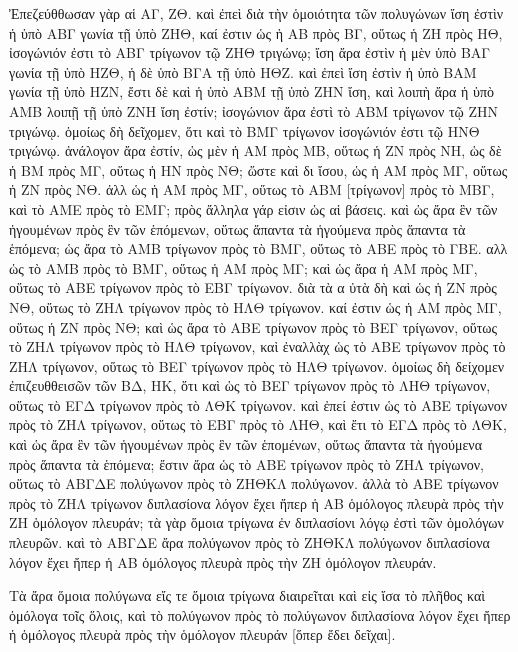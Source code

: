 \begin{Parallel}{}{}
{{\greekfont Ἐπεζεύθθωσαν γὰρ αἱ  ΑΓ, ΖΘ. καὶ ἐπεὶ διὰ τὴν ὁμοιότητα τῶν
πολυγώνων ἴση ἐστὶν ἡ ὑπὸ ΑΒΓ γωνία τῇ ὑπὸ ΖΗΘ, καί ἐστιν ὡς ἡ ΑΒ πρὸς ΒΓ, οὕτως ἡ ΖΗ πρὸς ΗΘ, ἰσογώνιόν ἐστι
τὸ ΑΒΓ τρίγωνον τῷ ΖΗΘ τριγώνῳ; ἴση ἄρα ἐστὶν ἡ μὲν
ὑπὸ ΒΑΓ γωνία τῇ ὑπὸ ΗΖΘ, ἡ δὲ ὑπὸ ΒΓΑ
τῇ ὑπὸ ΗΘΖ. καὶ ἐπεὶ ἴση ἐστὶν ἡ ὑπὸ ΒΑΜ γωνία τῇ ὑπὸ
ΗΖΝ, ἔστι δὲ καὶ ἡ ὑπὸ ΑΒΜ τῇ ὑπὸ ΖΗΝ ἴση, καὶ λοιπὴ
ἄρα ἡ ὑπὸ ΑΜΒ λοιπῇ τῇ ὑπὸ ΖΝΗ ἴση ἐστίν; ἰσογώνιον
ἄρα ἐστὶ τὸ ΑΒΜ τρίγωνον τῷ ΖΗΝ τριγώνῳ. ὁμοίως δὴ δεῖχομεν, ὅτι καὶ τὸ ΒΜΓ τρίγωνον ἰσογώνιόν ἐστι τῷ ΗΝΘ
τριγώνῳ. ἀνάλογον ἄρα ἐστίν, ὡς μὲν ἡ ΑΜ πρὸς ΜΒ, οὕτως ἡ ΖΝ πρὸς ΝΗ, ὡς δὲ ἡ ΒΜ πρὸς ΜΓ, οὕτως ἡ ΗΝ πρὸς ΝΘ; 
ὥστε καὶ δι ἴσου, ὡς ἡ ΑΜ πρὸς ΜΓ, οὕτως ἡ ΖΝ πρὸς ΝΘ.
ἀλλ ὡς ἡ ΑΜ πρὸς ΜΓ, οὕτως τὸ ΑΒΜ [τρίγωνον] πρὸς τὸ
ΜΒΓ, καὶ τὸ ΑΜΕ πρὸς τὸ  ΕΜΓ; πρὸς ἄλληλα γάρ εἰσιν
ὡς αἱ βάσεις. καὶ ὡς ἄρα ἓν τῶν ἡγουμένων πρὸς ἓν
τῶν ἑπόμενων, οὕτως ἅπαντα τὰ ἡγούμενα πρὸς ἅπαντα
τὰ ἑπόμενα; ὡς ἄρα τὸ ΑΜΒ τρίγωνον πρὸς τὸ ΒΜΓ, οὕτως τὸ
ΑΒΕ πρὸς τὸ ΓΒΕ. αλλ ὡς τὸ ΑΜΒ πρὸς τὸ ΒΜΓ, οὕτως
ἡ ΑΜ πρὸς ΜΓ; καὶ ὡς ἄρα ἡ ΑΜ πρὸς ΜΓ, οὕτως τὸ ΑΒΕ
τρίγωνον πρὸς τὸ ΕΒΓ τρίγωνον. διὰ τὰ α ὐτὰ δὴ καὶ ὡς ἡ ΖΝ πρὸς
ΝΘ, οὕτως τὸ ΖΗΛ τρίγωνον πρὸς τὸ ΗΛΘ τρίγωνον. καί ἐστιν ὡς
ἡ ΑΜ πρὸς ΜΓ, οὕτως ἡ ΖΝ πρὸς ΝΘ; καὶ ὡς ἄρα τὸ ΑΒΕ τρίγωνον 
πρὸς τὸ ΒΕΓ τρίγωνον, οὕτως τὸ ΖΗΛ τρίγωνον πρὸς τὸ ΗΛΘ τρίγωνον,
καὶ ἐναλλὰχ ὡς τὸ ΑΒΕ τρίγωνον πρὸς τὸ ΖΗΛ τρίγωνον, οὕτως
τὸ ΒΕΓ τρίγωνον πρὸς τὸ ΗΛΘ τρίγωνον. ὁμοίως δὴ δείχομεν
ἐπιζευθθεισῶν τῶν ΒΔ, ΗΚ, ὅτι καὶ ὡς τὸ ΒΕΓ τρίγωνον πρὸς
τὸ ΛΗΘ τρίγωνον, οὕτως τὸ ΕΓΔ τρίγωνον πρὸς τὸ ΛΘΚ τρίγωνον.
καὶ ἐπεί ἐστιν ὡς τὸ ΑΒΕ τρίγωνον πρὸς τὸ ΖΗΛ τρίγωνον,
οὕτως τὸ ΕΒΓ πρὸς τὸ ΛΗΘ, καὶ ἔτι τὸ ΕΓΔ πρὸς τὸ ΛΘΚ,
καὶ ὡς ἄρα ἓν τῶν ἡγουμένων πρὸς ἓν τῶν ἑπομένων, οὕτως ἅπαντα τὰ ἡγούμενα πρὸς ἅπαντα τὰ ἑπόμενα; ἔστιν
ἄρα ὡς τὸ ΑΒΕ τρίγωνον πρὸς τὸ ΖΗΛ τρίγωνον, οὕτως 
τὸ ΑΒΓΔΕ πολύγωνον πρὸς τὸ ΖΗΘΚΛ πολύγωνον. ἀλλὰ τὸ
ΑΒΕ τρίγωνον πρὸς  τὸ ΖΗΛ τρίγωνον διπλασίονα λόγον ἔχει ἤπερ
ἡ ΑΒ ὁμόλογος πλευρὰ πρὸς τὴν ΖΗ ὁμόλογον πλευράν; τὰ γὰρ
ὅμοια τρίγωνα ἐν διπλασίονι λόγῳ ἐστὶ τῶν ὁμολόγων πλευρῶν.
καὶ τὸ ΑΒΓΔΕ ἄρα πολύγωνον πρὸς τὸ ΖΗΘΚΛ
πολύγωνον διπλασίονα λόγον ἔχει ἤπερ ἡ ΑΒ ὁμόλογος
πλευρὰ πρὸς τὴν ΖΗ ὁμόλογον πλευράν.}

{\greekfont Τὰ ἄρα ὅμοια  πολύγωνα εἴς τε ὅμοια τρίγωνα διαιρεῖται καὶ εἰς ἴσα
τὸ πλῆθος καὶ ὁμόλογα τοῖς ὅλοις, καὶ τὸ πολύγωνον πρὸς
τὸ πολύγωνον διπλασίονα λόγον ἔχει ἤπερ ἡ ὁμόλογος
πλευρὰ πρὸς τὴν ὁμόλογον πλευράν  [ὅπερ ἔδει δεῖχαι].}\\~\\~\\~\\~\\

}
\end{Parallel}
